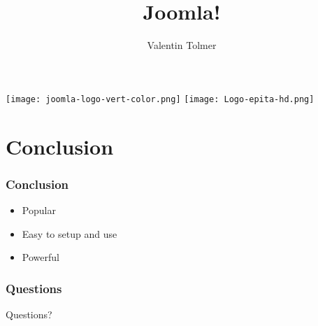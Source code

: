 \documentclass{beamer}
\title{Joomla!}
\author{Valentin Tolmer}
\date{}
\institute{GCONFS -- EPITA 2013}
\newlength{\wideitemsep}
\let\olditem\item
\renewcommand{\item}{\setlength{\itemsep}{\wideitemsep}\olditem}
\begin{document}
\begin{frame}
  \titlepage
    \texttt{[image: joomla-logo-vert-color.png]}
    \hfill
    \texttt{[image: Logo-epita-hd.png]}
\end{frame}

\begin{frame}
  \tableofcontents[pausesections ]
\end{frame}







\section{Conclusion}
\setcounter{subsection}{1}
\begin{frame}
\frametitle{Conclusion}
  \begin{itemize}[<+->]
    \item Popular
    \item Easy to setup and use
    \item Powerful
  \end{itemize}
\end{frame}

\begin{frame}
\frametitle{Questions}
  Questions?
\end{frame}
\end{document}
